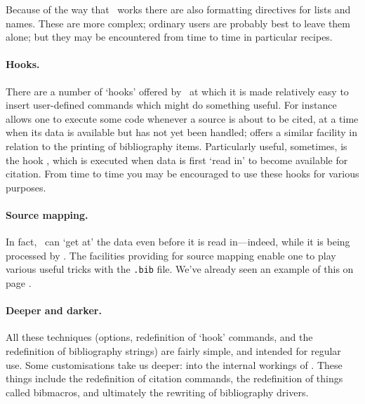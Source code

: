 Because of the way that \biblatex\ works there are also formatting
directives for lists and
names.
These are more complex; ordinary users are probably best to leave them
alone; but they may be encountered from time to time in particular recipes.

\paragraph{Hooks.} There are a number
of `hooks' offered by \biblatex\ at which it is made relatively easy
to insert user-defined commands which might do something useful. For
instance  allows one to
execute some code whenever a source is about to be cited, at a time
when its data is available but has not yet been handled;
 offers a similar facility
in relation to the printing of bibliography items. Particularly
useful, sometimes, is the hook ,
which is executed when data is first `read in' to become available for
citation. From time to time you may be encouraged to use these hooks
for various purposes.

\paragraph{Source mapping.} In fact,
\biblatex\ can `get at' the data even before it is read in---indeed,
while it is being processed by . The facilities
providing for source mapping enable one to play various useful tricks
with the \verb|.bib| file. We've already seen an example of this on
page \pageref{datamap}.

\paragraph{Deeper and darker.}
All these techniques (options, redefinition of `hook' commands, and
the redefinition of bibliography strings) are fairly simple, and
intended for regular use. Some customisations take us deeper: into the
internal workings of \biblatex. These things include the redefinition
of citation commands, the redefinition of things called bibmacros, and
ultimately the rewriting of bibliography drivers.

